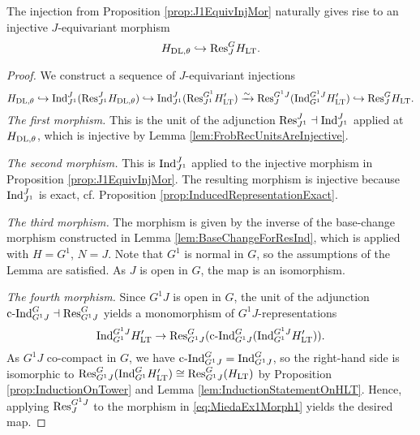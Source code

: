 \documentclass[../main.tex]{subfiles}
\begin{document}
\begin{lem} \label{lem:JEquivInjMor}
  The injection from Proposition \ref{prop:J1EquivInjMor} naturally gives rise to
  an injective $J$-equivariant morphism
  \begin{equation*}
    H_{\mathrm{DL},\theta} \hookrightarrow \mathrm{Res}_J^G H_{\mathrm{LT}}.
  \end{equation*}
\begin{proof}
  We construct a sequence of $J$-equivariant injections
  \begin{equation*}
    H_{\mathrm{DL},\theta} \hookrightarrow \mathrm{Ind}_{J^1}^J ( \mathrm{Res}_{J^1}^J H_{\mathrm{DL},\theta}) \hookrightarrow
    \mathrm{Ind}_{J^1}^J (\mathrm{Res}_{J^1}^{G^1} H'_{\mathrm{LT}}) \\ \xrightarrow{\sim} \mathrm{Res}_J^{G^1J}(
    \mathrm{Ind}_{G^1}^{G^1J} H'_{\mathrm{LT}}) 
 \hookrightarrow \mathrm{Res}_J^G H_{\mathrm{LT}}.
  \end{equation*}
  \textit{The first morphism.}
  This is the unit of the adjunction $\mathrm{Res}_{J^1}^J \dashv \mathrm{Ind}_{J^1}^J$ 
  applied at $H_{\mathrm{DL},\theta}$, which is injective by Lemma
  \ref{lem:FrobRecUnitsAreInjective}.

  \textit{The second morphism.}
  This is $\mathrm{Ind}_{J^1}^J$ applied to the injective morphism in Proposition
  \ref{prop:J1EquivInjMor}. The resulting morphism is injective because
  $\mathrm{Ind}_{J^1}^J$ is exact, cf. Proposition
  \ref{prop:InducedRepresentationExact}. 

  \textit{The third morphism.} 
  The morphism is given by the inverse of the base-change morphism constructed in
  Lemma \ref{lem:BaseChangeForResInd}, which is applied with $H = G^1$, $N = J$. 
  Note that $G^1$ is normal in $G$, so the assumptions of the Lemma are
  satisfied. As $J$ is open in $G$, the map is an isomorphism. 
  
  \textit{The fourth morphism.}
  Since $G^1J$ is open in $G$, the unit of the adjunction $\mathrm{c\text{-}Ind}_{G^1J}^G \dashv
  \mathrm{Res}_{G^1J}^G$ yields a monomorphism of $G^1J$-representations 
  \begin{equation}\label{eq:MiedaEx1Morph1}
    \mathrm{Ind}_{G^1}^{G^1J} H_{\mathrm{LT}}' \to \mathrm{Res}_{G^1J}^G
    (\mathrm{c\text{-}Ind}_{G^1J}^G(\mathrm{Ind}_{G^1}^{G^1J} H'_{\mathrm{LT}})).
  \end{equation}
  As $G^1J$ co-compact in $G$, we have $\mathrm{c\text{-}Ind}_{G^1J}^G =
  \mathrm{Ind}_{G^1J}^G$, so the right-hand
  side is isomorphic to $\mathrm{Res}_{G^1J}^G(\mathrm{Ind}_{G^1}^G H'_{\mathrm{LT}}) \cong
  \mathrm{Res}_{G^1J}^G(H_{\mathrm{LT}})$ by Proposition \ref{prop:InductionOnTower} and 
  Lemma \ref{lem:InductionStatementOnHLT}. Hence, applying $\mathrm{Res}_J^{G^1J}$ to the
  morphism in \eqref{eq:MiedaEx1Morph1} yields the desired map.
\end{proof}
\end{lem}
\end{document}
